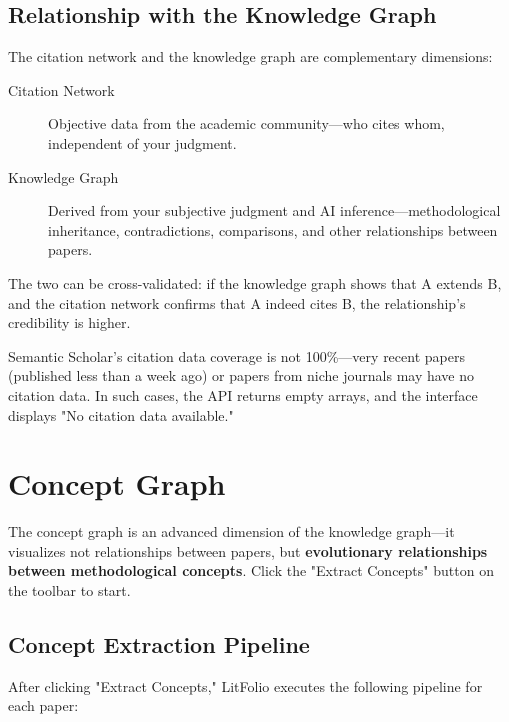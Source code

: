 \subsection{Relationship with the Knowledge Graph}

The citation network and the knowledge graph are complementary dimensions:

\begin{description}
  \item[Citation Network] Objective data from the academic community---who cites whom,
    independent of your judgment.
  \item[Knowledge Graph] Derived from your subjective judgment and AI inference---methodological
    inheritance, contradictions, comparisons, and other relationships between papers.
\end{description}

The two can be cross-validated: if the knowledge graph shows that A extends B, and the citation
network confirms that A indeed cites B, the relationship's credibility is higher.

\begin{warnbox}
Semantic Scholar's citation data coverage is not 100\%---very recent papers (published less than a
week ago) or papers from niche journals may have no citation data. In such cases, the API returns
empty arrays, and the interface displays "No citation data available."
\end{warnbox}

\section{Concept Graph}

The concept graph is an advanced dimension of the knowledge graph---it visualizes not relationships
between papers, but \textbf{evolutionary relationships between methodological concepts}. Click the
"Extract Concepts" button on the toolbar to start.


\subsection{Concept Extraction Pipeline}

After clicking "Extract Concepts," LitFolio executes the following pipeline for each paper:

